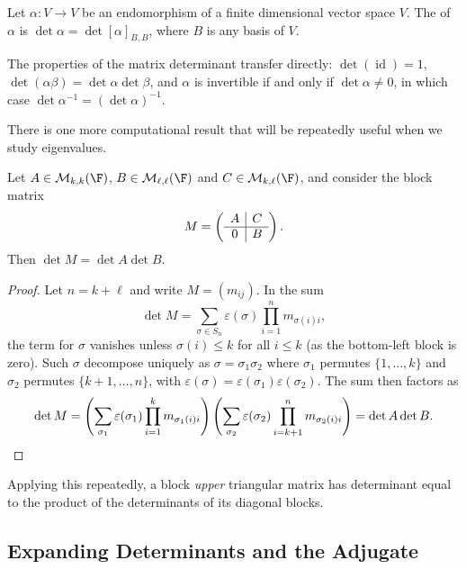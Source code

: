 \begin{definition}
    Let $\alpha: V \rightarrow V$ be an endomorphism of a finite dimensional vector space $V$. The  of $\alpha$ is $\det \alpha = \det [\alpha]_{B, B}$, where $B$ is any basis of $V$.
\end{definition}

The properties of the matrix determinant transfer directly: $\det (\operatorname{id}) = 1$, $\det (\alpha\beta) = \det \alpha \det \beta$, and $\alpha$ is invertible if and only if $\det \alpha \neq 0$, in which case $\det \alpha^{-1} = (\det \alpha)^{-1}$.

There is one more computational result that will be repeatedly useful when we study eigenvalues.

\begin{lemma}
    Let $A \in \mathcal{M}_{k,k}(\F)$, $B \in \mathcal{M}_{\ell,\ell}(\F)$ and $C \in \mathcal{M}_{k, \ell}(\F)$, and consider the block matrix
    $$
    M = \left(\begin{array}{ c | c }
        A & C \\
        \hline
        0 & B
      \end{array}\right).
    $$
    Then $\det M = \det A \det B$.
\end{lemma}
\begin{proof}
    Let $n = k + \ell$ and write $M = (m_{ij})$. In the sum
    $$
    \det M = \sum_{\sigma \in S_n} \varepsilon(\sigma) \prod_{i = 1}^n m_{\sigma(i)i},
    $$
    the term for $\sigma$ vanishes unless $\sigma(i) \leq k$ for all $i \leq k$ (as the bottom-left block is zero). Such $\sigma$ decompose uniquely as $\sigma = \sigma_1\sigma_2$ where $\sigma_1$ permutes $\{1, \dots, k\}$ and $\sigma_2$ permutes $\{k + 1, \dots, n\}$, with $\varepsilon(\sigma) = \varepsilon(\sigma_1)\varepsilon(\sigma_2)$. The sum then factors as
    $$
    \det M = \left(\sum_{\sigma_1} \varepsilon(\sigma_1) \prod_{i = 1}^{k} m_{\sigma_1(i)i}\right)\left(\sum_{\sigma_2} \varepsilon(\sigma_2) \prod_{i = k+1}^{n} m_{\sigma_2(i)i}\right) = \det A \det B. \qedhere
    $$
\end{proof}

Applying this repeatedly, a block \emph{upper} triangular matrix has determinant equal to the product of the determinants of its diagonal blocks.

\subsection{Expanding Determinants and the Adjugate}

